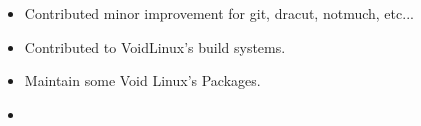 \documentclass[letterpaper,11pt]{article}
\begin{document}
\begin{itemize}
  \item Contributed minor improvement for git, dracut, notmuch, etc...
  \item Contributed to VoidLinux's build systems.
  \item Maintain some Void Linux's Packages.
\end{itemize}

\begin{itemize}
  \item[]
\end{itemize}


\end{document}
